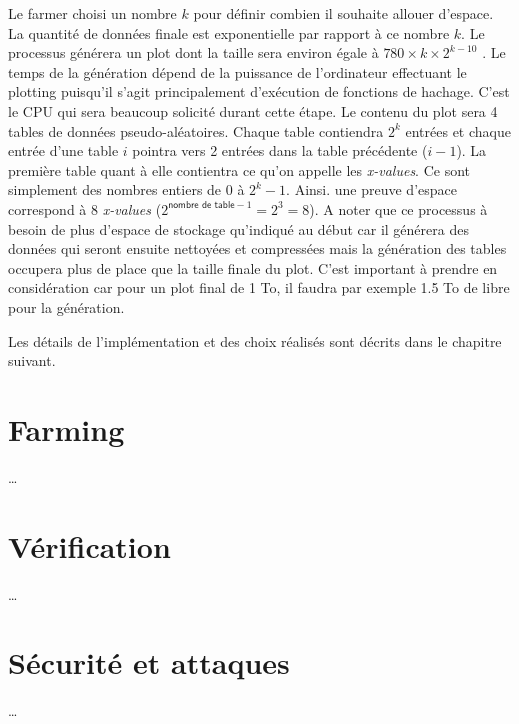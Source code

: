 \documentclass[../tb_report.tex]{subfiles}
\begin{document}
Le farmer choisi un nombre $k$ pour définir combien il souhaite allouer d'espace. La quantité de données finale est exponentielle par rapport à ce nombre $k$. Le processus générera un plot dont la taille sera environ égale à $780 \times k \times 2^{k-10}$ \cite{chia:consensus}. Le temps de la génération dépend de la puissance de l'ordinateur effectuant le plotting puisqu'il s'agit principalement d'exécution de fonctions de hachage. C'est le CPU qui sera beaucoup solicité durant cette étape. Le contenu du plot sera 4 tables de données pseudo-aléatoires. Chaque table contiendra $2^k$ entrées et chaque entrée d'une table $i$ pointra vers 2 entrées dans la table précédente ($i-1$). La première table quant à elle contientra ce qu'on appelle les \emph{x-values}. Ce sont simplement des nombres entiers de $0$ à $2^k-1$. Ainsi. une preuve d'espace correspond à 8 \emph{x-values} ($2^{\textsf{nombre de table} - 1} = 2^3 = 8$). A noter que ce processus à besoin de plus d'espace de stockage qu'indiqué au début car il générera des données qui seront ensuite nettoyées et compressées mais la génération des tables occupera plus de place que la taille finale du plot. C'est important à prendre en considération car pour un plot final de 1 To, il faudra par exemple 1.5 To de libre pour la génération. 





Les détails de l'implémentation et des choix réalisés sont décrits dans le chapitre suivant.

\section{Farming}

\dots

\section{Vérification}

\dots

\section{Sécurité et attaques}

\dots
\end{document}
